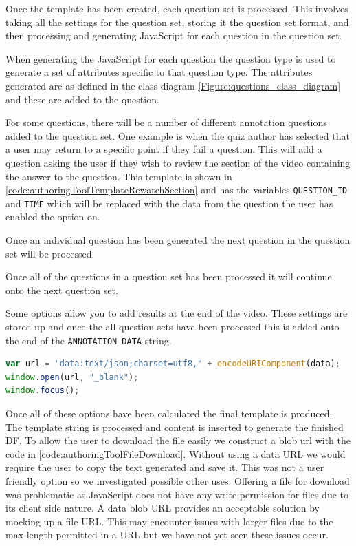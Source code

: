 Once the template has been created, each question set is processed. This involves taking all the settings for the question set, storing it the question set format, and then processing and generating JavaScript for each question in the question set.

When generating the JavaScript for each question the question type is used to generate a set of attributes specific to that question type. The attributes generated are as defined in the class diagram \autoref{Figure:questions_class_diagram} and these are added to the question.

For some questions, there will be a number of different annotation questions added to the question set. One example is when the quiz author has selected that a user may return to a specific point if they fail a question. This will add a question asking the user if they wish to review the section of the video containing the answer to the question. This template is shown in \autoref{code:authoringToolTemplateRewatchSection} and has the variables \lstinline|QUESTION_ID| and \lstinline|TIME| which will be replaced with the data from the question the user has enabled the option on.

Once an individual question has been generated the next question in the question set will be processed.

Once all of the questions in a question set has been processed it will continue onto the next question set.

Some options allow you to add results at the end of the video. These settings are stored up and once the all question sets have been processed this is added onto the end of the \lstinline|ANNOTATION_DATA| string.

\begin{lstlisting}[language=javascript,caption={The final \gls{DF} is offered for downloading using a data blob URL},label={code:authoringToolFileDownload} ]
var url = "data:text/json;charset=utf8," + encodeURIComponent(data);
window.open(url, "_blank");
window.focus();
\end{lstlisting}

Once all of these options have been calculated the final template is produced. The template string is processed and content is inserted to generate the finished \gls{DF}. To allow the user to download the file easily we construct a blob url with the code in \autoref{code:authoringToolFileDownload}. Without using a data URL we would require the user to copy the text generated and save it. This was not a user friendly option so we investigated possible other uses. Offering a file for download was problematic as JavaScript does not have any write permission for files due to its client side nature. A data blob URL provides an acceptable solution by mocking up a file URL. This may encounter issues with larger files due to the max length permitted in a URL but we have not yet seen these issues occur.

